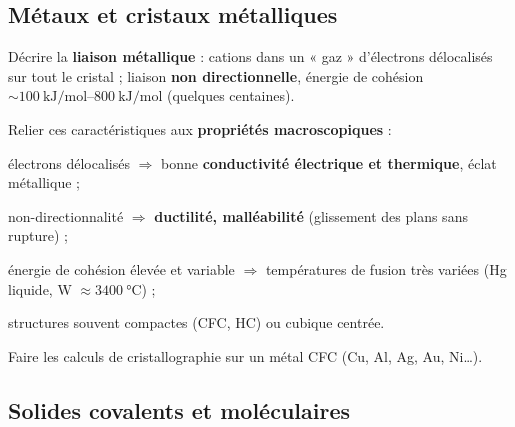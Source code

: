 \documentclass[11pt,a4paper]{article}
\begin{document}
\subsection{Métaux et cristaux métalliques}

\begin{savoir}
  \item Décrire la \textbf{liaison métallique} : cations dans un « gaz » d'électrons délocalisés
        sur tout le cristal ; liaison \textbf{non directionnelle}, énergie de cohésion
        $\sim\SIrange{100}{800}{\kilo\joule\per\mol}$ (quelques centaines).
  \item Relier ces caractéristiques aux \textbf{propriétés macroscopiques} :
    \begin{savoir}
      \item électrons délocalisés $\Rightarrow$ bonne \textbf{conductivité électrique et thermique},
            éclat métallique ;
      \item non-directionnalité $\Rightarrow$ \textbf{ductilité, malléabilité} (glissement des
            plans sans rupture) ;
      \item énergie de cohésion élevée et variable $\Rightarrow$ températures de fusion très variées
            (Hg liquide, W $\approx\SI{3400}{\celsius}$) ;
      \item structures souvent compactes (CFC, HC) ou cubique centrée.
    \end{savoir}
  \item Faire les calculs de cristallographie sur un métal CFC (Cu, Al, Ag, Au, Ni\dots).
\end{savoir}

\subsection{Solides covalents et moléculaires}
\end{document}
